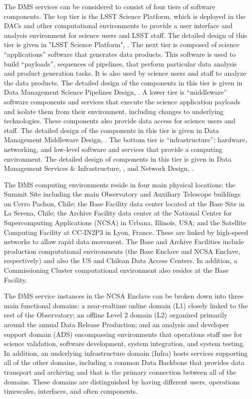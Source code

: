 \documentclass[DM,lsstdraft,toc]{lsstdoc}
\begin{document}
The DMS services can be considered to consist of four tiers of software
components. The top tier is the LSST Science Platform, which is deployed
in the DACs and other computational environments to provide a user
interface and analysis environment for science users and LSST staff. The
detailed design of this tier is given in "LSST Science Platform", . The next
tier is composed of science ``applications'' software that generates
data products. This software is used to build ``payloads'', sequences of
pipelines, that perform particular data analysis and product generation
tasks. It is also used by science users and staff to analyze the data
products. The detailed design of the components in this tier is given in
Data Management Science Pipelines Design, . A lower tier is
``middleware'' software components and services that execute the science
application payloads and isolate them from their environment, including
changes to underlying technologies. These components also provide data
access for science users and staff. The detailed design of the
components in this tier is given in Data Management Middleware Design,
. The bottom tier is ``infrastructure'': hardware, networking,
and low-level software and services that provide a computing
environment. The detailed design of components in this tier is given in
Data Management Services \& Infrastructure, , and Network Design,
.

The DMS computing environments reside in four main physical locations:
the Summit Site including the main Observatory and Auxiliary Telescope
buildings on Cerro Pachon, Chile; the Base Facility data center located
at the Base Site in La Serena, Chile; the Archive Facility data center
at the National Center for Supercomputing Applications (NCSA) in Urbana,
Illinois, USA; and the Satellite Computing Facility at CC-IN2P3 in Lyon,
France. These are linked by high-speed networks to allow rapid data
movement. The Base and Archive Facilities include production
computational environments (the Base Enclave and NCSA Enclave,
respectively) and also the US and Chilean Data Access Centers. In
addition, a Commissioning Cluster computational environment also resides
at the Base Facility.

The DMS service instances in the NCSA Enclave can be broken down into
three main functional domains: a near-realtime online domain (L1)
closely linked to the rest of the Observatory; an offline Level 2 domain
(L2) organized primarily around the annual Data Release Production; and
an analysis and developer support domain (ADS) encompassing environments
that operations staff use for science validation, software development,
system integration, and system testing. In addition, an underlying
infrastructure domain (Infra) hosts services supporting all of the other
domains, including a common Data Backbone that provides data transport
and archiving and that is the primary connection between all of the
domains. These domains are distinguished by having different users,
operations timescales, interfaces, and often components.
\end{document}
